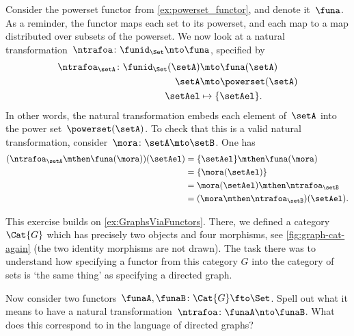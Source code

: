 \begin{example}
	Consider the powerset functor from \cref{ex:powerset_functor}, and denote it~$\funa$.
	As a reminder, the functor maps each set to its powerset, and each map to a map distributed over subsets of the powerset.
	We now look at a natural transformation~$\ntrafoa\colon \funid_\Set \nto \funa$, specified by
	\begin{equation*}
		\begin{aligned}
			\ntrafoa_\setA\colon \funid_\Set(\setA) & \mto \funa(\setA)     \\
			\setA                                   & \mto \powerset(\setA) \\
			\setAel                                 & \mapsto \{\setAel\}.
		\end{aligned}
	\end{equation*}
	In other words, the natural transformation embeds each element of~$\setA$ into the power set~$\powerset(\setA)$.
	To check that this is a valid natural transformation, consider~$\mora\colon \setA\mto \setB$.
	One has
	\begin{equation*}
		\begin{aligned}
			(\ntrafoa_\setA \mthen \funa(\mora))(\setAel)
			 & =\{\setAel\} \mthen \funa(\mora)         \\
			 & =\{\mora(\setAel)\}                      \\
			 & =\mora(\setAel)\mthen \ntrafoa_\setB     \\
			 & =(\mora \mthen \ntrafoa_\setB)(\setAel).
		\end{aligned}
	\end{equation*}
\end{example}

\begin{gradedexercise}
	\label{ex:NatTrafosGraphs}
	This exercise builds on \cref{ex:GraphsViaFunctors}.
	There, we defined a category~$\Cat{G}$ which has precisely two objects and four morphisms, see \cref{fig:graph-cat-again} (the two identity morphisms are not drawn).
	The task there was to understand how specifying a functor from this category $G$ into the category of sets is `the same thing' as specifying a directed graph.

	Now consider two functors~$\funaA, \funaB \colon \Cat{G} \fto \Set$.
	Spell out what it means to have a natural transformation~$\ntrafoa\colon \funaA \nto \funaB$.
	What does this correspond to in the language of directed graphs?
\end{gradedexercise}

